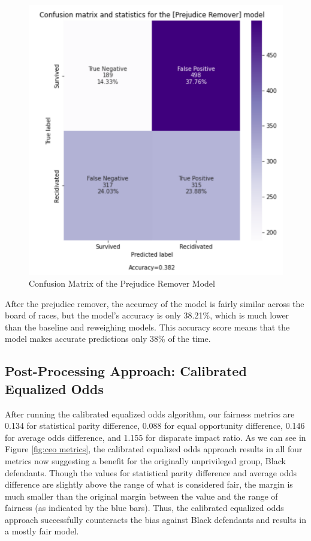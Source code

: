 \documentclass[water,article,submit,moreauthors,pdftex]{mdpi}
\begin{document}
\begin{figure}

{\centering \includegraphics[width=1\linewidth]{../images/prejudice_matrix} 

}

\caption{Confusion Matrix of the Prejudice Remover Model}\label{fig:prejudice matrix}
\end{figure}

After the prejudice remover, the accuracy of the model is fairly similar
across the board of races, but the model's accuracy is only 38.21\%,
which is much lower than the baseline and reweighing models. This
accuracy score means that the model makes accurate predictions only 38\%
of the time.

\hypertarget{post-processing-approach-calibrated-equalized-odds}{%
\subsection{Post-Processing Approach: Calibrated Equalized
Odds}\label{post-processing-approach-calibrated-equalized-odds}}

After running the calibrated equalized odds algorithm, our fairness
metrics are 0.134 for statistical parity difference, 0.088 for equal
opportunity difference, 0.146 for average odds difference, and 1.155 for
disparate impact ratio. As we can see in Figure \ref{fig:ceo metrics},
the calibrated equalized odds approach results in all four metrics now
suggesting a benefit for the originally unprivileged group, Black
defendants. Though the values for statistical parity difference and
average odds difference are slightly above the range of what is
considered fair, the margin is much smaller than the original margin
between the value and the range of fairness (as indicated by the blue
bars). Thus, the calibrated equalized odds approach successfully
counteracts the bias against Black defendants and results in a mostly
fair model.
\end{document}
